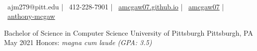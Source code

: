 \documentclass[]{awesome-cv}
\begin{document}
    
\begin{center}
	  \\
	\vspace{2mm}
    	{\faEnvelope\ ajm279@pitt.edu} | {\faMobile\ 412-228-7901} | {\faHome\ \href{https://amcgaw07.github.io/}{amcgaw07.github.io}} | {\faGithub\ \href{https://github.com/amcgaw07}{amcgaw07}} | {\faLinkedin\ \href{https://www.linkedin.com/in/anthony-mcgaw}{anthony-mcgaw}}
\end{center}
\vspace{5mm}
\begin{cventries}
	\cventry
	{Bachelor of Science in Computer Science}
	{University of Pittsburgh}
	{Pittsburgh, PA}
	{May 2021}
	{Honors: \textit{magna cum laude (GPA: 3.5)}}
	
	
\end{cventries}
\end{document}
